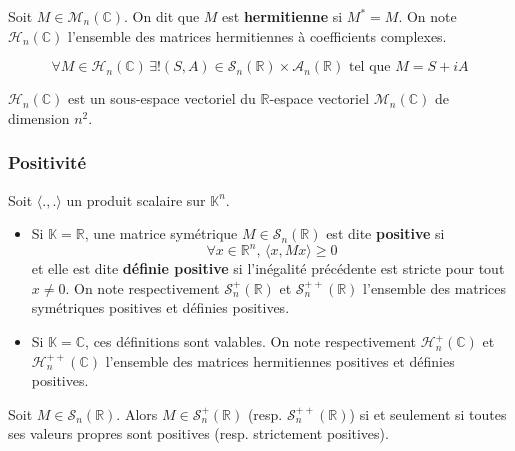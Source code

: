   \begin{definition}
    Soit $M \in \mathcal{M}_n(\mathbb{C})$. On dit que $M$ est \textbf{hermitienne} si $M^* = M$. On note $\mathcal{H}_n(\mathbb{C})$ l'ensemble des matrices hermitiennes à coefficients complexes.
  \end{definition}

  \begin{proposition}
    \[ \forall M \in \mathcal{H}_n(\mathbb{C}) \, \exists!(S, A) \in \mathcal{S}_n(\mathbb{R}) \times \mathcal{A}_n(\mathbb{R}) \text{ tel que } M = S+iA \]
  \end{proposition}

  \begin{corollary}
    $\mathcal{H}_n(\mathbb{C})$ est un sous-espace vectoriel du $\mathbb{R}$-espace vectoriel $\mathcal{M}_n(\mathbb{C})$ de dimension $n^2$.
  \end{corollary}

  \subsubsection{Positivité}


  \begin{definition}
    Soit $\langle ., . \rangle$ un produit scalaire sur $\mathbb{K}^n$.
    \begin{itemize}
      \item Si $\mathbb{K} = \mathbb{R}$, une matrice symétrique $M \in \mathcal{S}_n(\mathbb{R})$ est dite \textbf{positive} si
      \[ \forall x \in \mathbb{R}^n, \, \langle x, Mx \rangle \geq 0 \]
      et elle est dite \textbf{définie positive} si l'inégalité précédente est stricte pour tout $x \neq 0$. On note respectivement $\mathcal{S}_n^+(\mathbb{R})$ et $\mathcal{S}_n^{++}(\mathbb{R})$ l'ensemble des matrices symétriques positives et définies positives.
      \item Si $\mathbb{K} = \mathbb{C}$, ces définitions sont valables. On note respectivement $\mathcal{H}_n^+(\mathbb{C})$ et $\mathcal{H}_n^{++}(\mathbb{C})$ l'ensemble des matrices hermitiennes positives et définies positives.
    \end{itemize}
  \end{definition}

  \begin{proposition}
    Soit $M \in \mathcal{S}_n(\mathbb{R})$. Alors $M \in \mathcal{S}_n^+(\mathbb{R})$ (resp. $\mathcal{S}_n^{++}(\mathbb{R})$) si et seulement si toutes ses valeurs propres sont positives (resp. strictement positives).
  \end{proposition}

